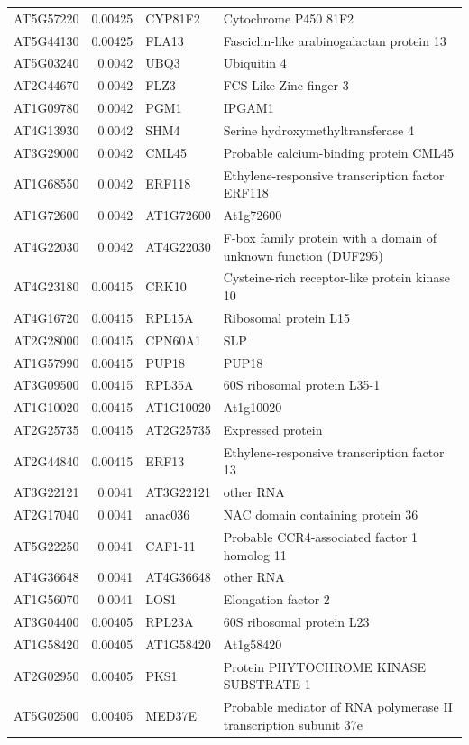 \documentclass[11pt]{article}
\begin{document}
\begin{center}
\begin{tabular}{lrll}
AT5G57220 & 0.00425 & CYP81F2 & Cytochrome P450 81F2\\
AT5G44130 & 0.00425 & FLA13 & Fasciclin-like arabinogalactan protein 13\\
AT5G03240 & 0.0042 & UBQ3 & Ubiquitin 4\\
AT2G44670 & 0.0042 & FLZ3 & FCS-Like Zinc finger 3\\
AT1G09780 & 0.0042 & PGM1 & IPGAM1\\
AT4G13930 & 0.0042 & SHM4 & Serine hydroxymethyltransferase 4\\
AT3G29000 & 0.0042 & CML45 & Probable calcium-binding protein CML45\\
AT1G68550 & 0.0042 & ERF118 & Ethylene-responsive transcription factor ERF118\\
AT1G72600 & 0.0042 & AT1G72600 & At1g72600\\
AT4G22030 & 0.0042 & AT4G22030 & F-box family protein with a domain of unknown function (DUF295)\\
AT4G23180 & 0.00415 & CRK10 & Cysteine-rich receptor-like protein kinase 10\\
AT4G16720 & 0.00415 & RPL15A & Ribosomal protein L15\\
AT2G28000 & 0.00415 & CPN60A1 & SLP\\
AT1G57990 & 0.00415 & PUP18 & PUP18\\
AT3G09500 & 0.00415 & RPL35A & 60S ribosomal protein L35-1\\
AT1G10020 & 0.00415 & AT1G10020 & At1g10020\\
AT2G25735 & 0.00415 & AT2G25735 & Expressed protein\\
AT2G44840 & 0.00415 & ERF13 & Ethylene-responsive transcription factor 13\\
AT3G22121 & 0.0041 & AT3G22121 & other RNA\\
AT2G17040 & 0.0041 & anac036 & NAC domain containing protein 36\\
AT5G22250 & 0.0041 & CAF1-11 & Probable CCR4-associated factor 1 homolog 11\\
AT4G36648 & 0.0041 & AT4G36648 & other RNA\\
AT1G56070 & 0.0041 & LOS1 & Elongation factor 2\\
AT3G04400 & 0.00405 & RPL23A & 60S ribosomal protein L23\\
AT1G58420 & 0.00405 & AT1G58420 & At1g58420\\
AT2G02950 & 0.00405 & PKS1 & Protein PHYTOCHROME KINASE SUBSTRATE 1\\
AT5G02500 & 0.00405 & MED37E & Probable mediator of RNA polymerase II transcription subunit 37e\\

\end{tabular}
\end{center}
\end{document}
